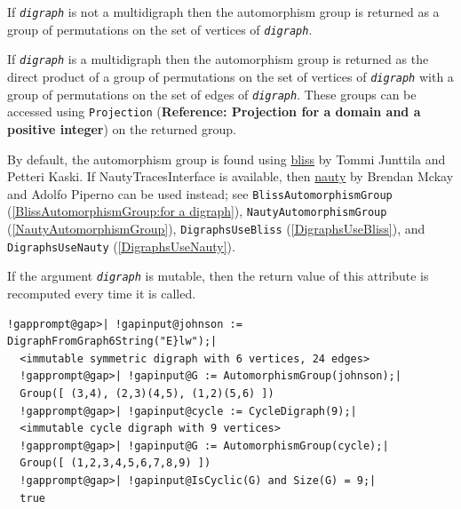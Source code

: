 \documentclass[a4paper,11pt]{report}
\begin{document}
{{{ If \mbox{\texttt{\mdseries\slshape digraph}} is not a multidigraph then the automorphism group is returned as a group of
permutations on the set of vertices of \mbox{\texttt{\mdseries\slshape digraph}}. 

 If \mbox{\texttt{\mdseries\slshape digraph}} is a multidigraph then the automorphism group is returned as the direct
product of a group of permutations on the set of vertices of \mbox{\texttt{\mdseries\slshape digraph}} with a group of permutations on the set of edges of \mbox{\texttt{\mdseries\slshape digraph}}. These groups can be accessed using \texttt{Projection} (\textbf{Reference: Projection for a domain and a positive integer}) on the returned group.

 By default, the automorphism group is found using \href{http://www.tcs.tkk.fi/Software/bliss/} {bliss}  by Tommi Junttila and Petteri Kaski. If \textsf{NautyTracesInterface} is available, then \href{https://pallini.di.uniroma1.it} {nauty}  by Brendan Mckay and Adolfo Piperno can be used instead; see \texttt{BlissAutomorphismGroup} (\ref{BlissAutomorphismGroup:for a digraph}), \texttt{NautyAutomorphismGroup} (\ref{NautyAutomorphismGroup}), \texttt{DigraphsUseBliss} (\ref{DigraphsUseBliss}), and \texttt{DigraphsUseNauty} (\ref{DigraphsUseNauty}). 

 If the argument \mbox{\texttt{\mdseries\slshape digraph}} is mutable, then the return value of this attribute is recomputed every time
it is called.

 
\begin{Verbatim}[commandchars=!@|,fontsize=\small,frame=single,label=Example]
  !gapprompt@gap>| !gapinput@johnson := DigraphFromGraph6String("E}lw");|
  <immutable symmetric digraph with 6 vertices, 24 edges>
  !gapprompt@gap>| !gapinput@G := AutomorphismGroup(johnson);|
  Group([ (3,4), (2,3)(4,5), (1,2)(5,6) ])
  !gapprompt@gap>| !gapinput@cycle := CycleDigraph(9);|
  <immutable cycle digraph with 9 vertices>
  !gapprompt@gap>| !gapinput@G := AutomorphismGroup(cycle);|
  Group([ (1,2,3,4,5,6,7,8,9) ])
  !gapprompt@gap>| !gapinput@IsCyclic(G) and Size(G) = 9;|
  true
\end{Verbatim}
 }

 

}}
\end{document}
